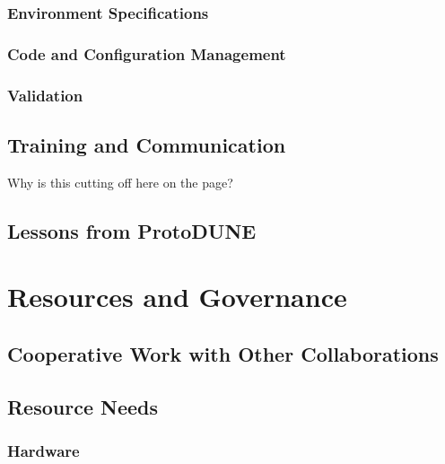 \subsubsection{Environment Specifications}
\label{ch:exec-comp-sw-devenv-spec}


\subsubsection{Code and Configuration Management}
\label{ch:exec-comp-sw-devenv-mgmt}


\subsubsection{Validation}
\label{ch:exec-comp-sw-devenv-val}


\subsection{Training and Communication}	
\label{ch:exec-comp-sw-train}
Why is this cutting off here on the page?

\subsection{Lessons from ProtoDUNE}	
\label{ch:exec-comp-sw-lessons}


\section{Resources and Governance}		
\label{ch:exec-comp-gov}


\subsection{Cooperative Work with Other Collaborations	}
\label{ch:exec-comp-gov-coop}

\subsection{Resource Needs}	
\label{ch:exec-comp-gov-res}

\subsubsection{Hardware}
\label{ch:exec-comp-gov-res-hw}

